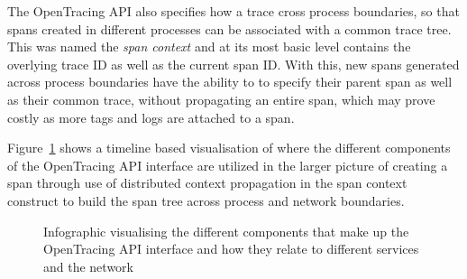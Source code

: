 \documentclass[12pt,pdftex,titlepage]{report}
\begin{document}
                The OpenTracing API also specifies how a trace cross process boundaries, so that spans created in different processes can be
                associated with a common trace tree. This was named the \textit{span context} and at its most basic level contains the 
                overlying trace ID as well as the current span ID. With this, new spans generated across process boundaries have the ability to
                to specify their parent span as well as their common trace, without propagating an entire span, which may prove costly as more
                tags and logs are attached to a span.

                Figure~\ref{fig:opentracing} shows a timeline based visualisation of where the different components of the OpenTracing API interface are utilized in
                the larger picture of creating a span through use of distributed context propagation in the span context construct to build the span tree across
                process and network boundaries.
                
                \begin{figure}[hbt!]
                    \centering
                    \caption{Infographic visualising the different components that make up the OpenTracing API interface and how they relate to different services
                    and the network}
                    \label{fig:opentracing}
                \end{figure}
\end{document}
